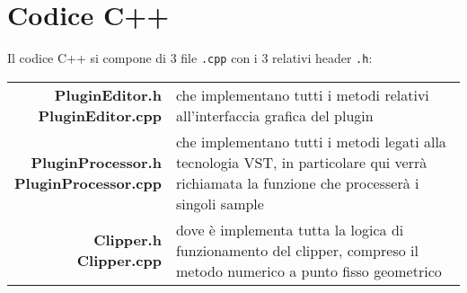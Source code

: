 \chapter{Codice C++}
	\label{code:cpp}
	Il codice C++ si compone di 3 file \texttt{.cpp} con i 3 relativi header \texttt{.h}:
	
	\noindent\hspace{5px}\begin{tabularx}{\textwidth}{r X}
		\makecell{\textbf{PluginEditor.h}\\\textbf{PluginEditor.cpp}}			&che implementano tutti i metodi relativi all'interfaccia grafica del plugin\\
		\makecell{\textbf{PluginProcessor.h}\\\textbf{PluginProcessor.cpp}}	&che implementano tutti i metodi legati alla tecnologia VST, in particolare qui verrà richiamata la funzione che processerà i singoli sample\\
		\makecell{\textbf{Clipper.h}\\\textbf{Clipper.cpp}}					&dove è implementa tutta la logica di funzionamento del clipper, compreso il metodo numerico a punto fisso geometrico
	\end{tabularx}\\
	
